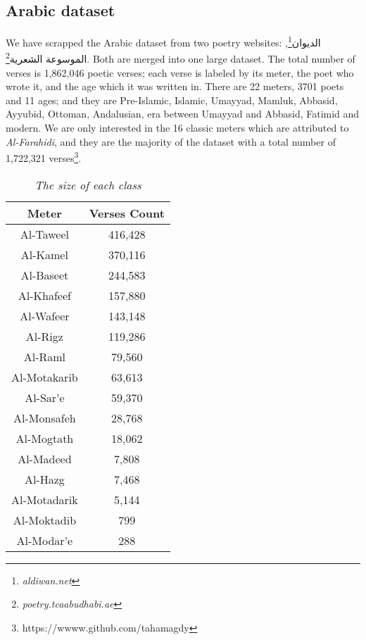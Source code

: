 \documentclass[12pt]{article}
\begin{document}
\subsection{Arabic dataset}
We have scrapped the Arabic dataset from two poetry websites:
\textarabic{الديوان}\footnote{\textit{aldiwan.net}}, \textarabic{الموسوعة
الشعرية}\footnote{\textit{poetry.tcaabudhabi.ae}}. Both are merged into one large
dataset.  The total number of verses is  1,862,046 poetic verses; each verse is
labeled by its meter, the poet who wrote it, and the
age which it was written in. There are 22 meters, 3701 poets and 11
ages; and they are Pre-Islamic, Islamic, Umayyad, Mamluk, Abbasid, Ayyubid, Ottoman,
Andalusian, era between Umayyad and Abbasid, Fatimid and modern.  We are only
interested  in the 16 classic meters which are attributed to \textit{Al-Farahidi},
and they are the majority of the dataset with a total number of 1,722,321
verses\footnote{https://wwww.github.com/tahamagdy}.


\begin{table}[!t]
  \centering
  \begin{tabular}{|c|c|} 
    \hline
    \textbf{Meter} & \textbf{Verses Count} \\ 
    \hline
    Al-Taweel       &     416,428 \\
    Al-Kamel        &     370,116 \\
    Al-Baseet       &     244,583 \\
    Al-Khafeef      &     157,880 \\
    Al-Wafeer       &     143,148 \\
    Al-Rigz         &     119,286 \\
    Al-Raml         &     79,560 \\
    Al-Motakarib    &     63,613 \\
    Al-Sar'e        &     59,370 \\
    Al-Monsafeh     &     28,768 \\
    Al-Mogtath      &     18,062 \\
    Al-Madeed       &     7,808 \\
    Al-Hazg         &     7,468 \\
    Al-Motadarik    &     5,144 \\
    Al-Moktadib     &     799 \\
    Al-Modar'e      &     288 \\
    \hline
  \end{tabular}
  \caption{\textit{The size of each class}}
  \label{data_size}
\end{table}
\end{document}
